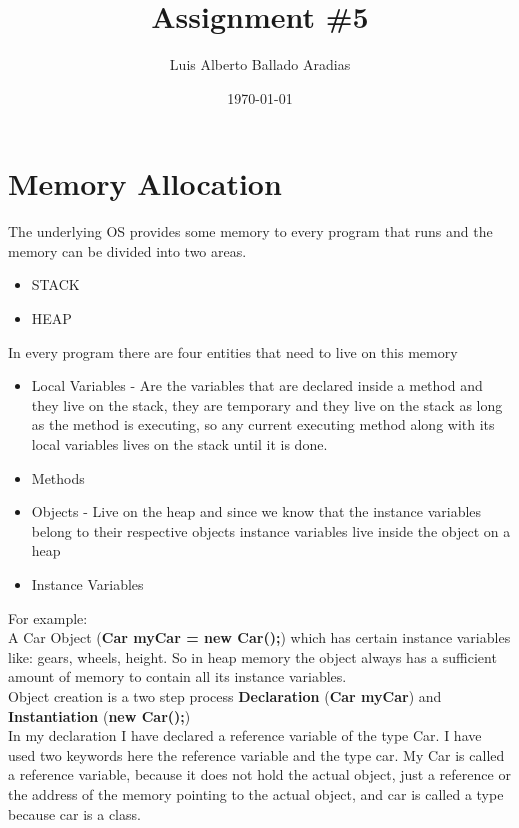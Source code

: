 \documentclass[
	12pt, %
]{fphw}
\title{Assignment \#5} %
\author{Luis Alberto Ballado Aradias} %
\date{\today} %
\institute{Centro de Investigación y de Estudios Avanzados del IPN \\ Unidad Tamaulipas} %
\begin{document}
\maketitle %


\section*{{\color{Apricot}Memory Allocation}}

The underlying OS provides some memory to every program that runs and the memory can be divided into two areas.

\begin{itemize}
\item STACK
\item HEAP
\end{itemize}

In every program there are four entities that need to live on this memory

\begin{itemize}
\item Local Variables - Are the variables that are declared inside a method and they live on the stack, they are temporary and they live on the stack as long as the method is executing, so any current executing method along with its local variables lives on the stack until it is done.
\item Methods
\item Objects - Live on the heap and since we know that the instance variables belong to their respective objects instance variables live inside the object on a heap
\item Instance Variables
\end{itemize}

For example:\\

A Car Object (\textbf{Car myCar = new Car();}) which has certain instance variables like: gears, wheels, height. So in heap memory the object always has a sufficient amount of memory to contain all its instance variables. \\

Object creation is a two step process \textbf{Declaration} (\textbf{Car myCar}) and \textbf{Instantiation} (\textbf{new Car();}) \\
In my declaration I have declared a reference variable of the type Car. I have used two keywords here the reference variable and the type car. My Car is called a reference variable, because it does not hold the actual object, just a reference or the address of the memory pointing to the actual object, and car is called a type because car is a class.\\
\end{document}
